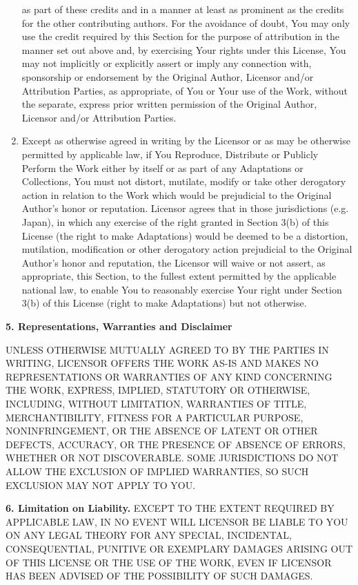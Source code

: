 \begin{enumerate}
  as part of these credits and in a manner at least as prominent as
  the credits for the other contributing authors. For the avoidance
  of doubt, You may only use the credit required by this Section for
  the purpose of attribution in the manner set out above and, by
  exercising Your rights under this License, You may not implicitly
  or explicitly assert or imply any connection with, sponsorship or
  endorsement by the Original Author, Licensor and/or Attribution
  Parties, as appropriate, of You or Your use of the Work, without
  the separate, express prior written permission of the Original
  Author, Licensor and/or Attribution Parties.
\item
  Except as otherwise agreed in writing by the Licensor or as may be
  otherwise permitted by applicable law, if You Reproduce, Distribute
  or Publicly Perform the Work either by itself or as part of any
  Adaptations or Collections, You must not distort, mutilate, modify
  or take other derogatory action in relation to the Work which would
  be prejudicial to the Original Author's honor or reputation.
  Licensor agrees that in those jurisdictions (e.g. Japan), in which
  any exercise of the right granted in Section 3(b) of this License
  (the right to make Adaptations) would be deemed to be a distortion,
  mutilation, modification or other derogatory action prejudicial to
  the Original Author's honor and reputation, the Licensor will waive
  or not assert, as appropriate, this Section, to the fullest extent
  permitted by the applicable national law, to enable You to
  reasonably exercise Your right under Section 3(b) of this License
  (right to make Adaptations) but not otherwise.
\end{enumerate}

\noindent \textbf{5. Representations, Warranties and Disclaimer}

UNLESS OTHERWISE MUTUALLY AGREED TO BY THE PARTIES IN WRITING,
LICENSOR OFFERS THE WORK AS-IS AND MAKES NO REPRESENTATIONS OR
WARRANTIES OF ANY KIND CONCERNING THE WORK, EXPRESS, IMPLIED,
STATUTORY OR OTHERWISE, INCLUDING, WITHOUT LIMITATION, WARRANTIES
OF TITLE, MERCHANTIBILITY, FITNESS FOR A PARTICULAR PURPOSE,
NONINFRINGEMENT, OR THE ABSENCE OF LATENT OR OTHER DEFECTS,
ACCURACY, OR THE PRESENCE OF ABSENCE OF ERRORS, WHETHER OR NOT
DISCOVERABLE. SOME JURISDICTIONS DO NOT ALLOW THE EXCLUSION OF
IMPLIED WARRANTIES, SO SUCH EXCLUSION MAY NOT APPLY TO YOU.

\noindent \textbf{6. Limitation on Liability.} EXCEPT TO THE EXTENT REQUIRED
BY APPLICABLE LAW, IN NO EVENT WILL LICENSOR BE LIABLE TO YOU ON
ANY LEGAL THEORY FOR ANY SPECIAL, INCIDENTAL, CONSEQUENTIAL,
PUNITIVE OR EXEMPLARY DAMAGES ARISING OUT OF THIS LICENSE OR THE
USE OF THE WORK, EVEN IF LICENSOR HAS BEEN ADVISED OF THE
POSSIBILITY OF SUCH DAMAGES.

